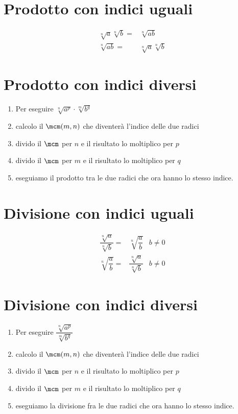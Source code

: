 \section{Prodotto con indici uguali}
\begin{align}
\sqrt[n]{a}\sqrt[n]{b}=&\sqrt[n]{ab}\\
\sqrt[n]{ab}=&\sqrt[n]{a}\sqrt[n]{b}
\end{align}
\section{Prodotto con indici diversi}
\begin{enumerate}
	\item Per eseguire $\sqrt[n]{a^p}\cdot\sqrt[m]{b^q}$
	\item calcolo il $\mcm(m,n)$ che diventerà l'indice  delle due radici
	\item divido il  $\mcm$ per $n$ e il risultato lo moltiplico per $p$
	\item divido il  $\mcm$ per $m$ e il risultato lo moltiplico per $q$
	\item eseguiamo  il prodotto tra le due radici che ora hanno lo stesso indice.
\end{enumerate}
\section{Divisione con indici uguali}
\begin{align}
\dfrac{\sqrt[n]{a}}{\sqrt[n]{b}}=&\sqrt[n]{\dfrac{a}{b}}&b\neq 0\\
\sqrt[n]{\dfrac{a}{b}}=&\dfrac{\sqrt[n]{a}}{\sqrt[n]{b}}&b\neq 0
\end{align}
\section{Divisione con indici diversi}
\begin{enumerate}
	\item Per eseguire
	$\dfrac{\sqrt[n]{a^p}}{\sqrt[m]{b^q}}$
	\item calcolo il $\mcm(m,n)$ che diventerà l'indice  delle due radici
	\item divido il  $\mcm$ per $n$ e il risultato lo moltiplico per $p$
	\item divido il  $\mcm$ per $m$ e il risultato lo moltiplico per $q$
	\item eseguiamo la divisione fra le due radici che ora hanno lo stesso indice.
\end{enumerate}
